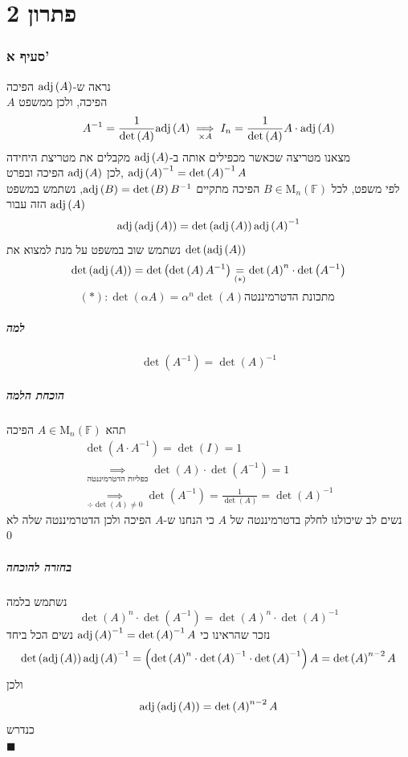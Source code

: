 \documentclass[12pt, titlepage]{article}
\begin{document}
\part*{פתרון 2}
\section*{סעיף א'}
נראה ש-$\mathrm{adj}\left(A\right)$ הפיכה \\
$A$ הפיכה, ולכן ממשפט
\[
    A^{-1} = \frac{1}{\det\left(A\right)}\mathrm{adj}\left(A\right) \underset{\times A}{\implies} I_n = \frac{1}{\det\left(A\right)}A\cdot\mathrm{adj}\left(A\right)
\]
מצאנו מטריצה שכאשר מכפילים אותה ב-$\mathrm{adj}\left(A\right)$ מקבלים את מטריצת היחידה\\
לכן $\mathrm{adj}\left(A\right)$ הפיכה ובפרט, $\mathrm{adj}\left(A\right)^{-1}=\det\left(A\right)^{-1}A$\\
לפי משפט, לכל $B\in\mathrm{M}_n\left(\mathbb{F}\right)$ הפיכה מתקיים $\mathrm{adj}\left(B\right)= \det\left(B\right)B^{-1}$, נשתמש במשפט הזה עבור $\mathrm{adj}\left(A\right)$
\[
    \mathrm{adj}\left(\mathrm{adj}\left(A\right)\right) = \det\left(\mathrm{adj}\left(A\right)\right) \mathrm{adj}\left(A\right)^{-1}
\]
נשתמש שוב במשפט על מנת למצוא את $\det\left(\mathrm{adj}\left(A\right)\right)$
\[
    \det\left(\mathrm{adj}\left(A\right)\right) =\det\left(\det\left(A\right)A^{-1}\right) \underset{\left(*\right)}{=} \det\left(A\right)^{n} \cdot \det\left(A^{-1}\right)
\]
\[
    \left(*\right):  \det\left(\alpha A\right) = \alpha^n \det\left(A\right)\text{מתכונת הדטרמיננטה }
\]
\subsubsection*{למה}
\[
    \det\left(A^{-1}\right)=\det\left(A\right)^{-1}
\]
\subsubsection*{הוכחת הלמה}
תהא $A\in\mathrm{M}_n\left(\mathbb{F}\right)$ הפיכה
\begin{gather*}
    \det\left(A\cdot A^{-1}\right) = \det\left(I\right) = 1 \\
    \underset{\text{כפליות הדטרמיננטה}}{\implies} \det\left(A\right) \cdot \det\left(A^{-1}\right) = 1\\
    \underset{\div \det\left(A\right) \neq 0}{\implies} \det\left(A^{-1}\right) = \frac{1}{\det\left(A\right)} = \det\left(A\right)^{-1}
\end{gather*}
נשים לב שיכולנו לחלק בדטרמיננטה של $A$ כי הנחנו ש-$A$ הפיכה ולכן הדטרמיננטה שלה לא $0$
\subsubsection*{בחזרה להוכחה}
נשתמש בלמה
\[
    \det\left(A\right)^n \cdot \det\left(A^{-1}\right) = \det\left(A\right)^n \cdot \det\left(A\right)^{-1}
\]
נזכר שהראינו כי $\mathrm{adj}\left(A\right)^{-1}=\det\left(A\right)^{-1}A$
נשים הכל ביחד
\[
    \det\left(\mathrm{adj}\left(A\right)\right)\mathrm{adj}\left(A\right)^{-1} = \left(\det\left(A\right)^{n} \cdot \det\left(A\right)^{-1} \cdot\det\left(A\right)^{-1}\right)A=\det\left(A\right)^{n-2}A
\]
ולכן
\[
 \mathrm{adj}\left(\mathrm{adj}\left(A\right)\right)=\det\left(A\right)^{n-2}A
\]
כנדרש\\
$\blacksquare$
\end{document}
